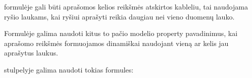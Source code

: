 \documentclass[letterpaper,10pt,lithuanian]{sphinxmanual}
\begin{document}
\sphinxAtStartPar
{\hyperref[\detokenize{dimensijos:property.prepare}]{}} formulėje gali būti aprašomos kelios reikšmės atskirtos
kableliu, tai naudojama ryšio laukams, kai ryšiui aprašyti reikia daugiau nei
vieno duomenų lauko.

\sphinxAtStartPar
Formulėje galima naudoti kitus to pačio modelio property pavadinimus, kai
aprašomo {\hyperref[\detokenize{formatas:property}]{}} reikšmės formuojamos dinamiškai naudojant vieną ar
kelis jau aprašytus laukus.

\sphinxAtStartPar
{\hyperref[\detokenize{dimensijos:property.prepare}]{}} stulpelyje galima naudoti tokias formules:
\end{document}
